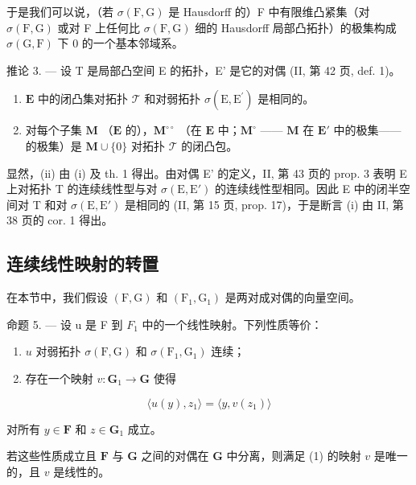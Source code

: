 于是我们可以说，（若 \(\sigma(\mathrm{F},\mathrm{G})\) 是 Hausdorff 的）F 中有限维凸紧集（对 \(\sigma(\mathrm{F},\mathrm{G})\) 或对 F 上任何比 \(\sigma(\mathrm{F},\mathrm{G})\) 细的 Hausdorff 局部凸拓扑）的极集构成 \(\sigma(\mathrm{G},\mathrm{F})\) 下 0 的一个基本邻域系。

推论 3. --- 设 T 是局部凸空间 E 的拓扑，E' 是它的对偶 (II, 第 42 页, def. 1)。

\begin{enumerate}
\def\labelenumi{(\roman{enumi})}
\item
  \(\mathbf{E}\) 中的闭凸集对拓扑 \(\mathcal{T}\) 和对弱拓扑 \(\sigma (\mathrm{E},\mathrm{E}^{\prime})\) 是相同的。
\item
  对每个子集 \(\mathbf{M}\) （\(\mathbf{E}\) 的），\(\mathbf{M}^{\circ \circ}\) （在 \(\mathbf{E}\) 中；\(\mathbf{M}^{\circ}\) —— \(\mathbf{M}\) 在 \(\mathbf{E}'\) 中的极集—— 的极集）是 \(\mathbf{M} \cup \{0\}\) 对拓扑 \(\mathcal{T}\) 的闭凸包。
\end{enumerate}

显然，(ii) 由 (i) 及 th. 1 得出。由对偶 E' 的定义，II, 第 43 页的 prop. 3 表明 E 上对拓扑 T 的连续线性型与对 \(\sigma(\mathrm{E}, \mathrm{E}')\) 的连续线性型相同。因此 E 中的闭半空间对 T 和对 \(\sigma(\mathrm{E}, \mathrm{E}')\) 是相同的 (II, 第 15 页, prop. 17)，于是断言 (i) 由 II, 第 38 页的 cor. 1 得出。

\subsection{连续线性映射的转置}

在本节中，我们假设 \((\mathrm{F},\mathrm{G})\) 和 \((\mathrm{F}_1,\mathrm{G}_1)\) 是两对成对偶的向量空间。

命题 5. --- 设 u 是 F 到 \(F_{1}\) 中的一个线性映射。下列性质等价：

\begin{enumerate}
\def\labelenumi{\alph{enumi})}
\item
  \(u\) 对弱拓扑 \(\sigma (\mathrm{F},\mathrm{G})\) 和 \(\sigma (\mathrm{F}_1,\mathrm{G}_1)\) 连续；
\item
  存在一个映射 \(v: \mathbf{G}_1 \to \mathbf{G}\) 使得
\end{enumerate}

\[
\langle u (y), z _ {1} \rangle = \langle y, v (z _ {1}) \rangle\tag{1}
\]

对所有 \(y \in \mathbf{F}\) 和 \(z \in \mathbf{G}_1\) 成立。

若这些性质成立且 \(\mathbf{F}\) 与 \(\mathbf{G}\) 之间的对偶在 \(\mathbf{G}\) 中分离，则满足 (1) 的映射 \(v\) 是唯一的，且 \(v\) 是线性的。

